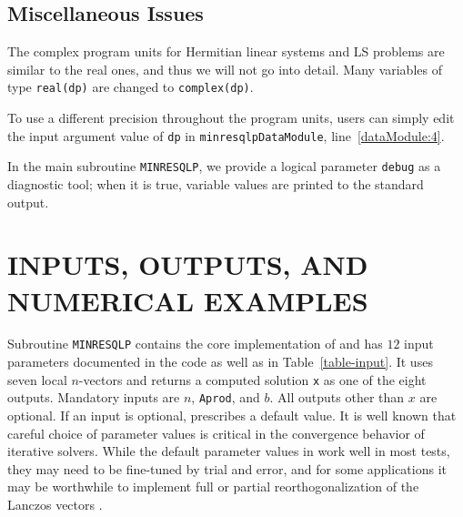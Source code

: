 \documentclass{doc_acmtrans2m}
\begin{document}
\subsection{Miscellaneous Issues}

The complex program units for Hermitian linear systems and LS problems
are similar to the real ones, and thus we will not go into detail.
Many variables of type \texttt{real(dp)} are changed to
\texttt{complex(dp)}.

To use a different precision throughout the program units, \MINRESQLP
users can simply edit the input argument value of \texttt{dp} in
\texttt{minresqlpDataModule}, line~\ref{dataModule:4}.

In the main subroutine \texttt{MINRESQLP}, we provide a logical
parameter \texttt{debug} as a diagnostic tool; when it is true,
variable values are printed to the standard output.


\section{INPUTS, OUTPUTS, AND NUMERICAL EXAMPLES}

Subroutine \texttt{MINRESQLP} contains the core implementation of
\MINRESQLP and has $12$ input parameters documented in the code as
well as in Table~\ref{table-input}.  It uses seven local $n$-vectors
and returns a computed solution \texttt{x} as one of the eight
outputs. Mandatory inputs are $n$, \texttt{Aprod}, and $b$.  All
outputs other than $x$ are optional. If an input is optional,
\MINRESQLP prescribes a default value.  It is well known that careful
choice of parameter values is critical in the convergence behavior of
iterative solvers.   While the default
parameter values in \MINRESQLP work well in most tests, they may need
to be fine-tuned by trial and error, and for some applications it may
be worthwhile to implement full or partial reorthogonalization of the
Lanczos vectors \cite{S84b}.
\end{document}
